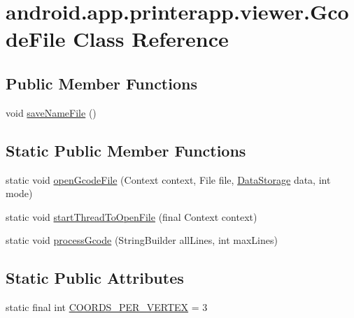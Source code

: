 \hypertarget{classandroid_1_1app_1_1printerapp_1_1viewer_1_1_gcode_file}{}\section{android.\+app.\+printerapp.\+viewer.\+Gcode\+File Class Reference}
\label{classandroid_1_1app_1_1printerapp_1_1viewer_1_1_gcode_file}
\subsection*{Public Member Functions}
\begin{DoxyCompactItemize}
\item 
void \hyperlink{classandroid_1_1app_1_1printerapp_1_1viewer_1_1_gcode_file_afb7a066e12ced8c87e8ebfbf1bbf6e6c}{save\+Name\+File} ()
\end{DoxyCompactItemize}
\subsection*{Static Public Member Functions}
\begin{DoxyCompactItemize}
\item 
static void \hyperlink{classandroid_1_1app_1_1printerapp_1_1viewer_1_1_gcode_file_a7f96ad7cae54946a6097acd14cc616a9}{open\+Gcode\+File} (Context context, File file, \hyperlink{classandroid_1_1app_1_1printerapp_1_1viewer_1_1_data_storage}{Data\+Storage} data, int mode)
\item 
static void \hyperlink{classandroid_1_1app_1_1printerapp_1_1viewer_1_1_gcode_file_a0d8c2a7c7a20d10418331ae7c90fe3d4}{start\+Thread\+To\+Open\+File} (final Context context)
\item 
static void \hyperlink{classandroid_1_1app_1_1printerapp_1_1viewer_1_1_gcode_file_a7d75329fb91840a5adb1659a4539ce00}{process\+Gcode} (String\+Builder all\+Lines, int max\+Lines)
\end{DoxyCompactItemize}
\subsection*{Static Public Attributes}
\begin{DoxyCompactItemize}
\item 
static final int \hyperlink{classandroid_1_1app_1_1printerapp_1_1viewer_1_1_gcode_file_a1ee328b23635aceecfba05344dcb6f70}{C\+O\+O\+R\+D\+S\+\_\+\+P\+E\+R\+\_\+\+V\+E\+R\+T\+EX} = 3
\end{DoxyCompactItemize}


